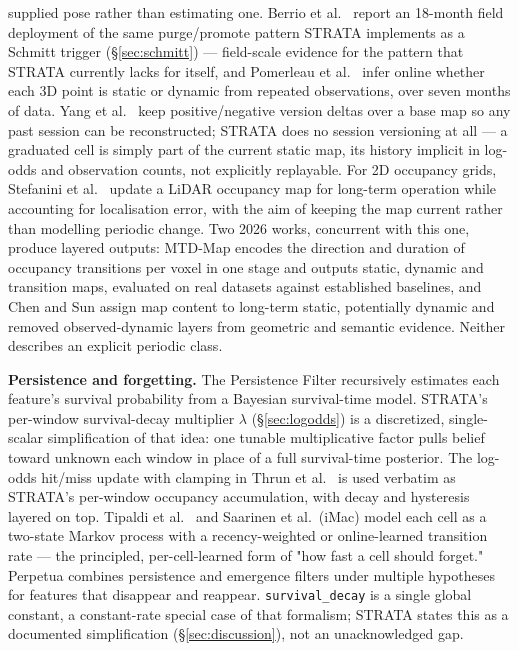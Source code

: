 \documentclass[conference]{IEEEtran}
\begin{document}
supplied pose rather than estimating one. Berrio et al.\ \cite{berrio2021longterm}
report an 18-month field deployment of the same purge/promote pattern STRATA
implements as a Schmitt trigger (\S\ref{sec:schmitt}) --- field-scale evidence for the pattern
that STRATA currently lacks for itself, and Pomerleau et al.\
\cite{pomerleau2014longterm} infer online whether each 3D point is static or
dynamic from repeated observations, over seven months of data. Yang et al.\
\cite{yang2025lifelong3d}
keep positive/negative version deltas over a base map so any past session can
be reconstructed; STRATA does no session versioning at all --- a graduated cell
is simply part of the current static map, its history implicit in log-odds
and observation counts, not explicitly replayable. For 2D occupancy grids,
Stefanini et al.\ \cite{stefanini2022efficient,stefanini2023safe} update a
LiDAR occupancy map for long-term operation while accounting for localisation
error, with the aim of keeping the map current rather than modelling periodic
change. Two 2026 works, concurrent with this one, produce layered outputs:
MTD-Map \cite{kim2026mtdmap} encodes the direction and duration of occupancy
transitions per voxel in one stage and outputs static, dynamic and transition
maps, evaluated on real datasets against established baselines, and Chen and
Sun \cite{chen2026layer} assign map content to long-term static, potentially
dynamic and removed observed-dynamic layers from geometric and semantic
evidence. Neither describes an explicit periodic class.

\textbf{Persistence and forgetting.} The Persistence Filter \cite{rosen2016persistence}
recursively estimates each feature's survival probability from a Bayesian
survival-time model. STRATA's per-window survival-decay multiplier $\lambda$
(\S\ref{sec:logodds}) is a discretized, single-scalar simplification of that idea: one tunable
multiplicative factor pulls belief toward unknown each window in place of a
full survival-time posterior. The log-odds hit/miss update with clamping in
Thrun et al.\ \cite{thrun2005probabilistic} is used verbatim as STRATA's per-window
occupancy accumulation, with decay and hysteresis layered on top. Tipaldi et
al.\ \cite{tipaldi2013lifelong} and Saarinen et al.\ (iMac) \cite{saarinen2012imac}
model each cell as a two-state Markov process with a recency-weighted or
online-learned transition rate --- the principled, per-cell-learned form of
"how fast a cell should forget." Perpetua \cite{saavedraruiz2025perpetua}
combines persistence and emergence filters under multiple hypotheses for
features that disappear and reappear. \texttt{survival\_decay} is a single global
constant, a constant-rate special case of that formalism; STRATA states this
as a documented simplification (\S\ref{sec:discussion}), not an unacknowledged gap.
\end{document}
